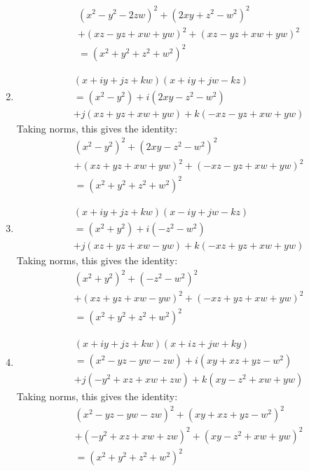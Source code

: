 \documentclass[12pt]{article}
\theoremstyle{definition}
\numberwithin{equation}{section}
\begin{document}
\begin{enumerate}[{Identity} I:]
    \begin{align*}
    &(x^2 - y^2 - 2zw )^2 + (2xy + z^2 - w^2)^2 \\
        &+ (xz - yz + xw + yw)^2 + (xz - yz + xw + yw)^2 \\
    &= (x^2 + y^2 + z^2 + w^2)^2
    \end{align*}
\item
    \begin{align*}
    &(x + iy + jz + kw)(x + iy + jw - kz) \\
    &= (x^2 - y^2 ) + i(2xy - z^2 - w^2) \\
        &+ j(xz + yz + xw + yw) + k(-xz - yz + xw + yw) 
    \end{align*}
Taking norms, this gives the identity:
    \begin{align*}
    &(x^2 - y^2 )^2 + (2xy - z^2 - w^2)^2 \\
        &+ (xz + yz + xw + yw)^2 + (-xz - yz + xw + yw)^2 \\ 
    &= (x^2 + y^2 + z^2 + w^2)^2
    \end{align*}
\item
    \begin{align*}
    &(x + iy + jz + kw)(x - iy + jw - kz) \\
    &= (x^2 + y^2 ) + i(- z^2 - w^2) \\
        &+ j(xz + yz + xw - yw) + k(-xz + yz + xw + yw) 
    \end{align*}
Taking norms, this gives the identity:
    \begin{align*}
    &(x^2 + y^2 )^2 + (- z^2 - w^2)^2 \\
        &+ (xz + yz + xw - yw)^2 + (-xz + yz + xw + yw)^2 \\
    &= (x^2 + y^2 + z^2 + w^2)^2
    \end{align*}
\item
    \begin{align*}
    &(x + iy + jz + kw)(x + iz + jw + ky) \\
    &= (x^2 - yz - yw - zw ) + i(xy + xz + yz - w^2) \\
        &+ j(-y^2 + xz + xw + zw) + k(xy - z^2 + xw + yw) 
    \end{align*}
Taking norms, this gives the identity:
    \begin{align*}
    &(x^2 - yz - yw - zw )^2 + (xy + xz + yz - w^2)^2 \\
        &+ (-y^2 + xz + xw + zw)^2 + (xy - z^2 + xw + yw)^2 \\
    &= (x^2 + y^2 + z^2 + w^2)^2
    \end{align*}

\end{enumerate}
\end{document}
